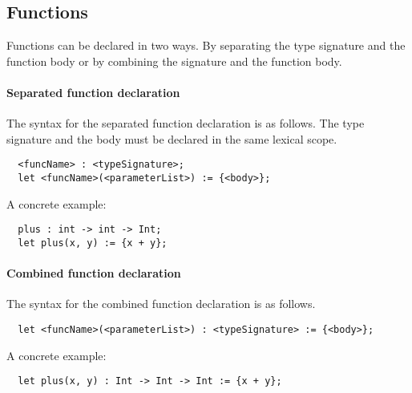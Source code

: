 \subsection{Functions}
\label{subsec:functions}

Functions can be declared in two ways. By separating the type signature and the function body or by combining the signature and the function body.

\paragraph{Separated function declaration}

The syntax for the separated function declaration is as follows. The type signature and the body must be declared in the same lexical scope.

\begin{verbatim}
  <funcName> : <typeSignature>;
  let <funcName>(<parameterList>) := {<body>};
\end{verbatim}

A concrete example:

\begin{verbatim}
  plus : int -> int -> Int;
  let plus(x, y) := {x + y};
\end{verbatim}


\paragraph{Combined function declaration}

The syntax for the combined function declaration is as follows.

\begin{verbatim}
  let <funcName>(<parameterList>) : <typeSignature> := {<body>};
\end{verbatim}

A concrete example:

\begin{verbatim}
  let plus(x, y) : Int -> Int -> Int := {x + y};
\end{verbatim}
